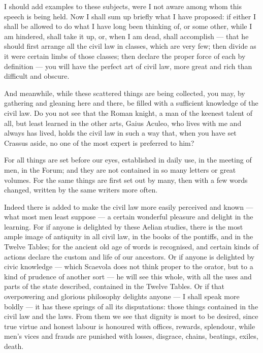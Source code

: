  I should add examples to these subjects, were I not aware among whom this speech is being held. Now I shall sum up briefly what I have proposed: if either I shall be allowed to do what I have long been thinking of, or some other, while I am hindered, shall take it up, or, when I am dead, shall accomplish — that he should first arrange all the civil law in classes, which are very few; then divide as it were certain limbs of those classes; then declare the proper force of each by definition — you will have the perfect art of civil law, more great and rich than difficult and obscure.

 And meanwhile, while these scattered things are being collected, you may, by gathering and gleaning here and there, be filled with a sufficient knowledge of the civil law. Do you not see that the Roman knight, a man of the keenest talent of all, but least learned in the other arts, Gaius Aculeo, who lives with me and always has lived, holds the civil law in such a way that, when you have set Crassus aside, no one of the most expert is preferred to him?

 For all things are set before our eyes, established in daily use, in the meeting of men, in the Forum; and they are not contained in so many letters or great volumes. For the same things are first set out by many, then with a few words changed, written by the same writers more often.

 Indeed there is added to make the civil law more easily perceived and known — what most men least suppose — a certain wonderful pleasure and delight in the learning. For if anyone is delighted by these Aelian studies, there is the most ample image of antiquity in all civil law, in the books of the pontiffs, and in the Twelve Tables; for the ancient old age of words is recognised, and certain kinds of actions declare the custom and life of our ancestors. Or if anyone is delighted by civic knowledge — which Scaevola does not think proper to the orator, but to a kind of prudence of another sort — he will see this whole, with all the uses and parts of the state described, contained in the Twelve Tables. Or if that overpowering and glorious philosophy delights anyone — I shall speak more boldly — it has these springs of all its disputations: those things contained in the civil law and the laws. From them we see that dignity is most to be desired, since true virtue and honest labour is honoured with offices, rewards, splendour, while men's vices and frauds are punished with losses, disgrace, chains, beatings, exiles, death.

